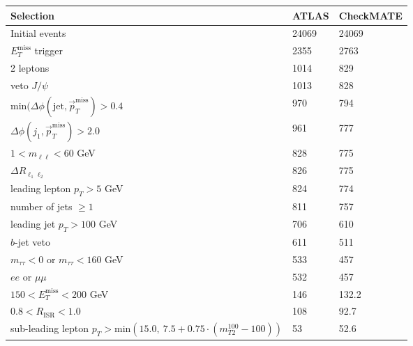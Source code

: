 \documentclass[12pt,fleqn]{article}
\begin{document}
\begin{enumerate}
\begin{table}[h!] \begin{center}
 \renewcommand*{\arraystretch}{1.2}
 \begin{tabular}{l|p{3cm}|p{3cm}} \toprule
  Selection                                                                       & ATLAS    & CheckMATE       \\ \midrule
  Initial events                                                                  & 24069     &  24069          \\
  $E_T^\mathrm{miss}$ trigger                                                     & 2355      &  2763 \\
  2 leptons                                                                       & 1014     &   829\\
  veto $J/\psi$                                                                   & 1013     &   828 \\ 
  min$(\Delta\phi(\mathrm{jet}, \vec{p}_T^\mathrm{miss})>0.4$                     & 970     &    794\\   
  $\Delta\phi(j_1, \vec{p}_T^\mathrm{miss})>2.0$                                  & 961     &    777\\
  $1 < m_{\ell \ell} < 60$ GeV                                                    & 828     &    775\\
  $\Delta R_{\ell_1 \ell_2}$                                                      & 826     &    775\\
  leading lepton $p_T > 5$ GeV                                                    & 824     &    774\\
  number of jets $\geq 1$                                                         & 811     &    757\\
  leading jet $p_T > 100 $ GeV                                                    & 706     &    610\\ 
  $b$-jet veto                                                                    & 611     &    511\\
  $m_{\tau\tau} < 0$ or $m_{\tau\tau} < 160$ GeV                                  & 533     &    457\\
  $ee$ or $\mu\mu$                                                                & 532     &    457\\
  $150 < E_T^\mathrm{miss} < 200$ GeV                                             & 146     &    132.2\\
  $0.8 < R_{\mathrm{ISR}}< 1.0 $                                                   & 108     &    92.7 \\
  sub-leading lepton $p_T > \mathrm{min}(15.0,\ 7.5 + 0.75 \cdot (m_{T2}^{100} - 100))$  &  53   &  52.6 \\
  \bottomrule
 \end{tabular}\end{center}
\end{table} 
 

\end{enumerate}
\end{document}
